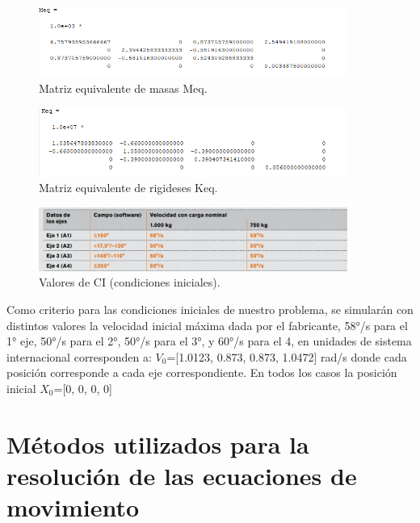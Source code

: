 \documentclass{aleph-revista}
\begin{document}
{\begin{figure}[H]
    \centering
    \includegraphics[width=0.90\textwidth]{Imagenes/meq.png}
    \caption{Matriz equivalente de masas Meq.}
    \label{fig:etiqueta de la figura}
\end{figure}

\begin{figure}[H]
    \centering
    \includegraphics[width=0.90\textwidth]{Imagenes/keq.png}
    \caption{Matriz equivalente de rigideses Keq.}
    \label{fig:etiqueta de la figura}
\end{figure}

\begin{figure}[H]
    \centering
    \includegraphics[width=0.90\textwidth]{Imagenes/cei.jpg}
    \caption{Valores de CI (condiciones iniciales).}
    \label{fig:etiqueta de la figura}
\end{figure}

Como criterio para las condiciones iniciales de nuestro problema, se simularán con distintos valores la velocidad inicial máxima dada por el fabricante, 58°/s para el 1° eje, 50°/s para el 2°, 50°/s para el 3°, y 60°/s para el 4, en unidades de sistema internacional corresponden a:
$V_0$=[1.0123, 0.873, 0.873, 1.0472] rad/s donde cada posición corresponde a cada eje correspondiente. En todos los casos la posición inicial $X_0$=[0, 0, 0, 0]

\section{Métodos utilizados para la resolución de las ecuaciones de movimiento}

}
\end{document}
